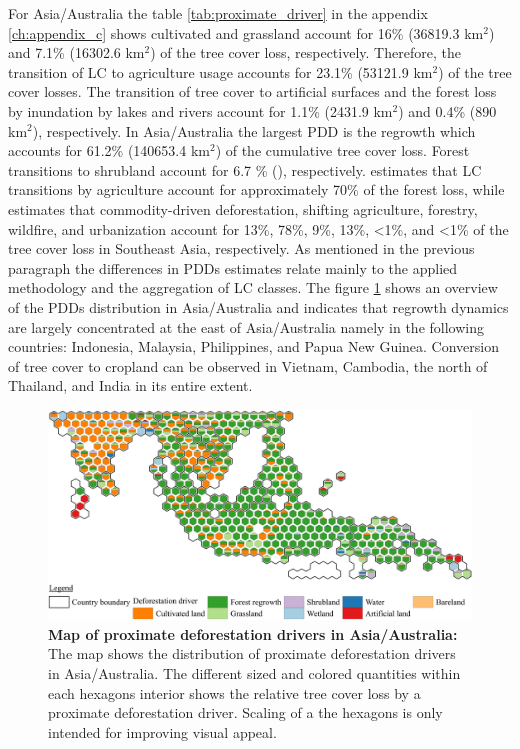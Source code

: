			For Asia/Australia the table \ref{tab:proximate_driver} in the appendix \ref{ch:appendix_c} shows cultivated and grassland account for 16\% (36819.3 km$^2$) and 7.1\% (16302.6 km$^2$) of the tree cover loss, respectively. Therefore, the transition of \ac{LC} to agriculture usage accounts for 23.1\% (53121.9 km$^2$) of the tree cover losses. The transition of tree cover to artificial surfaces and the forest loss by inundation by lakes and rivers account for 1.1\% (2431.9 km$^2$) and 0.4\% (890 km$^2$), respectively. In Asia/Australia the largest \ac{PDD} is the regrowth which accounts for 61.2\% (140653.4 km$^2$) of the cumulative tree cover loss. Forest transitions to shrubland account for 6.7 \% (), respectively. \citet{Hosonuma2012} estimates that \ac{LC} transitions by agriculture account for approximately 70\% of the forest loss, while \citet{Curtis2018} estimates that commodity-driven deforestation, shifting agriculture, forestry, wildfire, and urbanization account for 13\%, 78\%, 9\%, 13\%, <1\%, and <1\% of the tree cover loss in Southeast Asia, respectively. As mentioned in the previous paragraph the differences in \acp{PDD} estimates relate mainly to the applied methodology and the aggregation of \ac{LC} classes. The figure \ref{fig:asia_driver} shows an overview of the \acp{PDD} distribution in Asia/Australia and indicates that regrowth dynamics are largely concentrated at the east of Asia/Australia namely in the following countries: Indonesia, Malaysia, Philippines, and Papua New Guinea. Conversion of tree cover to cropland can be observed in Vietnam, Cambodia, the north of Thailand, and India in its entire extent. 
			\begin{figure}[ht]
				\centering
				\includegraphics[scale=1]{img/asia_driver_frameless}
				\caption[Map of proximate deforestation drivers in Asia/Australia]{\textbf{Map of proximate deforestation drivers in Asia/Australia:} The map shows the distribution of proximate deforestation drivers in Asia/Australia. The different sized and colored quantities within each hexagons interior shows the relative tree cover loss by a proximate deforestation driver. Scaling of a the hexagons is only intended for improving visual appeal.}
				\label{fig:asia_driver}
			\end{figure}

